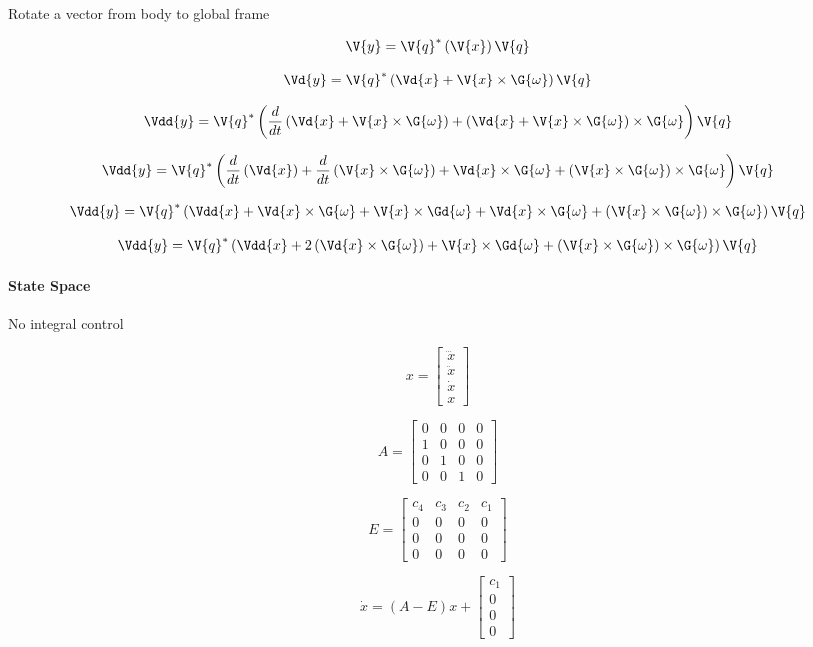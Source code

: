 
Rotate a vector from body to global frame

\[
\V{y} = \V{q}^* \left( \V{x} \right) \V{q}
\]

\[
\Vd{y} = \V{q}^* \left( \Vd{x} + \V{x} \times \G{\omega} \right) \V{q}
\]

\[
\Vdd{y} = \V{q}^* \left( \frac{d}{dt} \left( \Vd{x} + \V{x} \times \G{\omega} \right) + \left(\Vd{x} + \V{x} \times \G{\omega} \right) \times \G{\omega} \right) \V{q}
\]

\[
\Vdd{y} = \V{q}^* \left(
\frac{d}{dt} \left( \Vd{x} \right) +
\frac{d}{dt} \left( \V{x} \times \G{\omega} \right) +
\Vd{x} \times \G{\omega} +
\left(\V{x} \times \G{\omega} \right) \times \G{\omega}
\right) \V{q}
\]

\[
\Vdd{y} = \V{q}^* \left(
\Vdd{x} +
\Vd{x} \times \G{\omega} +
\V{x} \times \Gd{\omega} +
\Vd{x} \times \G{\omega} +
\left(\V{x} \times \G{\omega} \right) \times \G{\omega}
\right) \V{q}
\]

\[
\Vdd{y} = \V{q}^* \left(
\Vdd{x} +
2 \left( \Vd{x} \times \G{\omega} \right) +
\V{x} \times \Gd{\omega} +
\left(\V{x} \times \G{\omega} \right) \times \G{\omega}
\right) \V{q}
\]

\paragraph{State Space}

No integral control

\[
x =
\begin{bmatrix}
\dddot{x} \\
\ddot{x} \\
\dot{x} \\
x
\end{bmatrix}
\]

\[
A =
\begin{bmatrix}
0 & 0 & 0 & 0 \\
1 & 0 & 0 & 0 \\
0 & 1 & 0 & 0 \\
0 & 0 & 1 & 0
\end{bmatrix}
\]

\[
E =
\begin{bmatrix}
c_4 & c_3 & c_2 & c_1 \\
0 & 0 & 0 & 0 \\
0 & 0 & 0 & 0 \\
0 & 0 & 0 & 0
\end{bmatrix}
\]

\[
\dot{x} = (A-E)x +
\begin{bmatrix}
c_1 \\
0 \\
0 \\
0
\end{bmatrix}
\]





